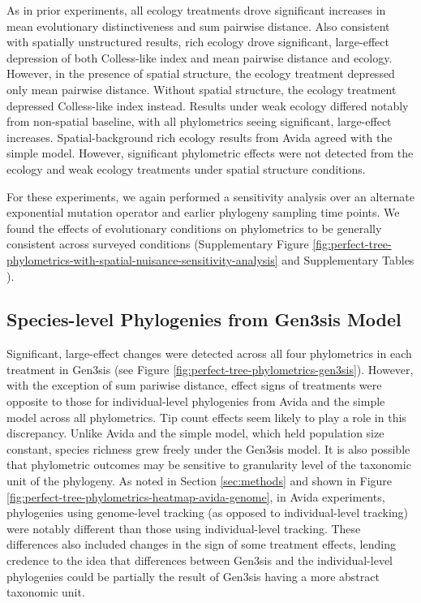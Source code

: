 As in prior experiments, all ecology treatments drove significant increases in mean evolutionary distinctiveness and sum pairwise distance.
Also consistent with spatially unstructured results, rich ecology drove significant, large-effect depression of both Colless-like index and mean pairwise distance and ecology.
However, in the presence of spatial structure, the ecology treatment depressed only mean pairwise distance.
Without spatial structure, the ecology treatment depressed Colless-like index instead.
Results under weak ecology differed notably from non-spatial baseline, with all phylometrics seeing significant, large-effect increases.
Spatial-background rich ecology results from Avida agreed with the simple model.
However, significant phylometric effects were not detected from the ecology and weak ecology treatments under spatial structure conditions.

For these experiments, we again performed a sensitivity analysis over an alternate exponential mutation operator and earlier phylogeny sampling time points.
We found the effects of evolutionary conditions on phylometrics to be generally consistent across surveyed conditions (Supplementary Figure \ref{fig:perfect-tree-phylometrics-with-spatial-nuisance-sensitivity-analysis} and Supplementary Tables ).

\subsection{Species-level Phylogenies from Gen3sis Model}




Significant, large-effect changes were detected across all four phylometrics in each treatment in Gen3sis (see Figure \ref{fig:perfect-tree-phylometrics-gen3sis}).
However, with the exception of sum pariwise distance, effect signs of treatments were opposite to those for individual-level phylogenies from Avida and the simple model across all phylometrics.
Tip count effects seem likely to play a role in this discrepancy.
Unlike Avida and the simple model, which held population size constant, species richness grew freely under the Gen3sis model.
It is also possible that phylometric outcomes may be sensitive to granularity level of the taxonomic unit of the phylogeny.
As noted in Section \ref{sec:methods} and shown in Figure \ref{fig:perfect-tree-phylometrics-heatmap-avida-genome}, in Avida experiments, phylogenies using genome-level tracking (as opposed to individual-level tracking) were notably different than those using individual-level tracking.
These differences also included changes in the sign of some treatment effects, lending credence to the idea that differences between Gen3sis and the individual-level phylogenies could be partially the result of Gen3sis having a more abstract taxonomic unit.


